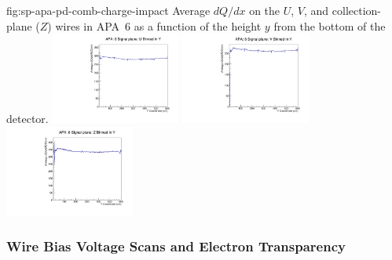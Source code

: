 \begin{dunefigure}{fig:sp-apa-pd-comb-charge-impact}
{Average $dQ/dx$ on the $U$, $V$, and collection-plane ($Z$) wires in APA~6 as a function of the height $y$ from the bottom of the  detector. }
\includegraphics[width=0.32\textwidth]{graphics/sp-apa-comb-apa6sUbY.pdf}
\includegraphics[width=0.32\textwidth]{graphics/sp-apa-comb-apa6sVbY.pdf}
\includegraphics[width=0.32\textwidth]{graphics/sp-apa-comb-apa6sZbY.pdf}   
\end{dunefigure}

\subsubsection{Wire Bias Voltage Scans and Electron Transparency}
\label{sec:fdsp-apa-qa-protodune-ops-bias-scans}


